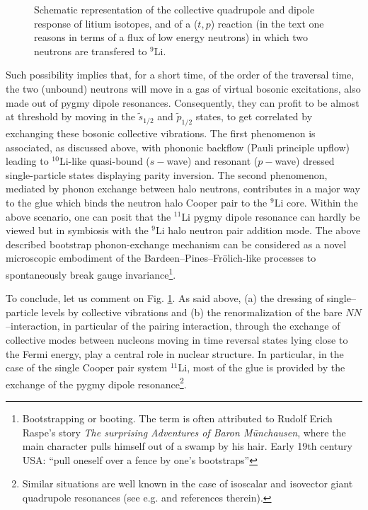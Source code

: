 \begin{subappendices}
\begin{figure}[h!]
\begin{center}
	\end{center}
	\caption{Schematic representation of the collective quadrupole and dipole response of litium isotopes, and of a ($t,p$) reaction (in the text one reasons in terms of a flux of low energy neutrons) in which two neutrons are transfered to $^9$Li.}
\label{fig8_A_1}
\end{figure}
Such possibility implies that, for a short time, of the order of the traversal time, the two (unbound) neutrons will move in a gas of virtual bosonic excitations, also made out of  pygmy dipole resonances. Consequently, they can profit to be almost at threshold by moving in the $\tilde s_{1/2}$ and $\tilde p_{1/2}$ states, to get correlated by exchanging  these bosonic collective vibrations. 
The first phenomenon is associated, as discussed above, with phononic backflow (Pauli principle upflow) leading to $^{10}$Li-like quasi-bound ($s-$wave) and resonant ($p-$wave) dressed single-particle states displaying parity inversion.
The second phenomenon, mediated by phonon exchange between halo neutrons, contributes in a major way to the glue which binds the neutron halo Cooper pair to the $^{9}$Li core. Within the above scenario, one can posit that the $^{11}$Li  pygmy dipole resonance can hardly be viewed but in symbiosis with the $^9$Li halo neutron pair addition mode. The above described bootstrap phonon-exchange mechanism can be considered as a novel microscopic embodiment of the Bardeen--Pines--Fr\"{o}lich-like processes to spontaneously break gauge invariance\footnote{Bootstrapping or booting. The term is often attributed to Rudolf Erich Raspe's story \textit{The surprising Adventures of Baron M\=unchausen}, where the main character pulls himself out of a swamp by his hair. Early 19th century USA: ``pull oneself over a fence by one's bootstraps''}.


To conclude, let us comment on Fig. \ref{fig8_A_1}. As said above, (a) the dressing of single--particle levels by collective vibrations and (b) the renormalization of the bare $NN$--interaction, in particular of the pairing interaction, through the exchange of collective modes between nucleons moving in time reversal states lying close to the Fermi energy, play a central role in nuclear structure. In particular, in the case of the single Cooper pair system $^{11}$Li, most of the glue is provided by the exchange of the  pygmy dipole resonance\footnote{Similar situations are well known in the case of isoscalar and isovector giant quadrupole resonances (see e.g. \cite{Bes:75c} and references therein).}.   






\end{subappendices}
